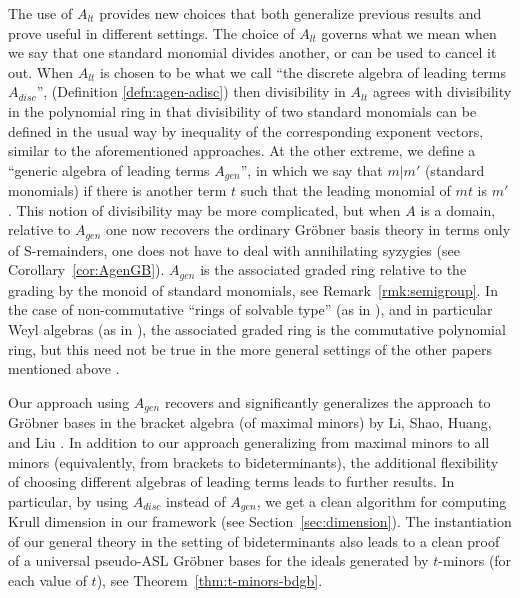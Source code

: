 \documentclass[11pt,reqno]{amsart}
\theoremstyle{definition}
\numberwithin{equation}{section}
\begin{document}
The use of $A_{lt}$ provides new choices that both generalize previous results and prove useful in different settings.
The choice of $A_{lt}$ governs what we mean when we say that one standard monomial divides another, or can be used to cancel it out. When $A_{lt}$ is chosen to be what we call ``the discrete algebra of leading terms $A_{disc}$'', (Definition \ref{defn:agen-adisc}) then divisibility in $A_{lt}$ agrees with divisibility in the polynomial ring in that divisibility of two standard monomials can be defined in the usual way by inequality of the corresponding exponent vectors, similar to the aforementioned approaches. At the other extreme, we define a ``generic algebra of leading terms $A_{gen}$'', in which we say that $m | m'$ (standard monomials) if there is another term $t$ such that the leading monomial of $mt$ is $m'$. This notion of divisibility may be more complicated, but when $A$ is a domain, relative to $A_{gen}$ one now recovers the ordinary Gröbner basis theory in terms only of S-remainders, one does not have to deal with annihilating syzygies (see Corollary~\ref{cor:AgenGB}). $A_{gen}$ is the associated graded ring relative to the grading by the monoid of standard monomials, see Remark~\ref{rmk:semigroup}. In the case of non-commutative ``rings of solvable type'' (as in \cite{KRW}), and in particular Weyl algebras (as in \cite{saito1998grobner}), the associated graded ring is the commutative polynomial ring, but this need not be true in the more general settings of the other papers mentioned above \cite{moraZacharias,spear,zacharias,HOS}.

Our approach using $A_{gen}$ recovers and significantly generalizes the approach to Gröbner bases in the bracket algebra (of maximal minors) by Li, Shao, Huang, and Liu \cite{li-reduction-2014}. In addition to our approach generalizing from maximal minors to all minors (equivalently, from brackets to bideterminants), the additional flexibility of choosing different algebras of leading terms leads to further results. In particular, by using $A_{disc}$ instead of $A_{gen}$, we get a clean algorithm for computing Krull dimension in our framework (see Section~\ref{sec:dimension}). The instantiation of our general theory in the setting of bideterminants also leads to a clean proof of a universal pseudo-ASL Gröbner bases for the ideals generated by $t$-minors (for each value of $t$), see Theorem~\ref{thm:t-minors-bdgb}.
\end{document}
